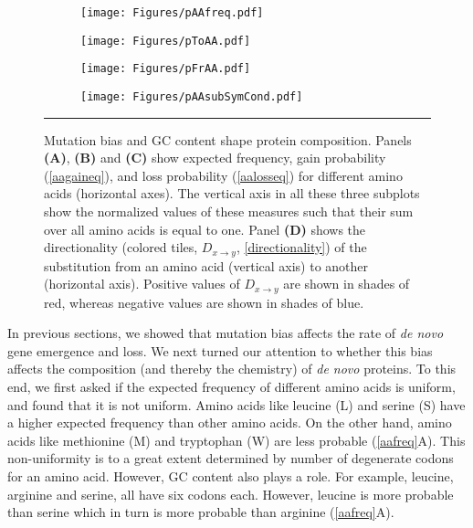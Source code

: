 \documentclass[12pt,a4paper]{article}
\begin{document}
\begin{figure}[!t]
\centering
\begin{subfigure}{0.47\textwidth}
\caption{}
\flushleft
\texttt{[image: Figures/pAAfreq.pdf]}
\end{subfigure}\hfill%
\begin{subfigure}{0.47\textwidth}
\caption{}
\flushleft
\texttt{[image: Figures/pToAA.pdf]}
\end{subfigure}

\vspace{1em}

\begin{subfigure}[t]{0.47\textwidth}
\caption{}
\flushleft
\texttt{[image: Figures/pFrAA.pdf]}
\end{subfigure}\hfill%
\begin{subfigure}[t]{0.47\textwidth}
\caption{}
\flushright
\texttt{[image: Figures/pAAsubSymCond.pdf]}
\end{subfigure}

\caption{Mutation bias and GC content shape protein composition. Panels \textbf{(A)}, \textbf{(B)} and \textbf{(C)} show expected frequency, gain probability (\autoref{aagaineq}), and loss probability (\autoref{aalosseq}) for different amino acids (horizontal axes). The vertical axis in all these three subplots show the normalized values of these measures such that their sum over all amino acids is equal to one. Panel \textbf{(D)} shows the directionality (colored tiles, $\textit{D}_{x\to y}$, \autoref{directionality}) of the substitution from an amino acid (vertical axis) to another (horizontal axis). Positive values of $\textit{D}_{x\to y}$ are shown in shades of red, whereas negative values are shown in shades of blue.}
\label{aafreq}

\vspace{1ex}
\hrule
\end{figure}

In previous sections, we showed that mutation bias affects the rate of \textit{de novo} gene emergence and loss. We next turned our attention to whether this bias affects the composition (and thereby the chemistry) of \textit{de novo} proteins. To this end, we first asked if the expected frequency of different amino acids is uniform, and found that it is not uniform. Amino acids like leucine (L) and serine (S) have a higher expected frequency than other amino acids. On the other hand, amino acids like methionine (M) and tryptophan (W) are less probable (\autoref{aafreq}A). This non-uniformity is to a great extent determined by number of degenerate codons for an amino acid. However, GC content also plays a role. For example, leucine, arginine and serine, all have six codons each. However, leucine is more probable than serine which in turn is more probable than arginine (\autoref{aafreq}A). 
\end{document}

